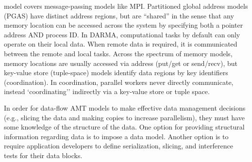 \begin{compactdesc}
{  model} covers message-passing models like MPI. Partitioned global address models (PGAS) have distinct address regions,
  but are ``shared'' in the sense that any memory location can be accessed across the system by specifying both a pointer address AND process ID. 
  In DARMA, computational tasks by default can only operate on their local data. When remote data
     is required, it is communicated between the remote and local tasks.
    Across the spectrum of memory models, memory locations are usually
    accessed via address (put/get or send/recv), but key-value store (tuple-space) models identify data regions by key identifiers (coordination).
    In coordination, parallel workers never directly communicate, instead `coordinating'' indirectly via a \gls{key-value store} or \gls{tuple space}.  
\item[Data model:]
  In order for data-flow \gls{AMT} models to make effective data management
  decisions (e.g., \gls{slicing} the data and making copies to increase
  parallelism), they must have some knowledge of the structure of the data.
  One option for providing structural information regarding data is to impose a
  \gls{data model}.  Another option is to require application developers to define
  \gls{serialization}, \gls{slicing}, and \glspl{interference test} for their data blocks. 
\end{compactdesc}

